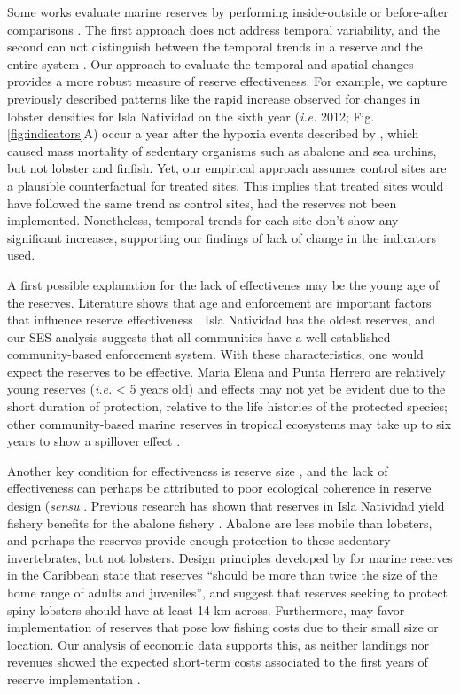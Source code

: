 \documentclass{frontiersSCNS}
\theoremstyle{definition}
\theoremstyle{definition}
\theoremstyle{definition}
\theoremstyle{remark}
\begin{document}
Some works evaluate marine reserves by performing inside-outside
\citep{guidetti_2014-8Z,friedlander_2017-oI,rodriguez_2017-PD} or
before-after comparisons \citep{betti_2017-lq}. The first approach does
not address temporal variability, and the second can not distinguish
between the temporal trends in a reserve and the entire system
\citep{depalma_2018}. Our approach to evaluate the temporal and spatial
changes provides a more robust measure of reserve effectiveness. For
example, we capture previously described patterns like the rapid
increase observed for changes in lobster densities for Isla Natividad on
the sixth year (\emph{i.e.} 2012; Fig. \ref{fig:indicators}A) occur a
year after the hypoxia events described by \citet{micheli_2012-EU},
which caused mass mortality of sedentary organisms such as abalone and
sea urchins, but not lobster and finfish. Yet, our empirical approach
assumes control sites are a plausible counterfactual for treated sites.
This implies that treated sites would have followed the same trend as
control sites, had the reserves not been implemented. Nonetheless,
temporal trends for each site don't show any significant increases,
supporting our findings of lack of change in the indicators used.

A first possible explanation for the lack of effectivenes may be the
young age of the reserves. Literature shows that age and enforcement are
important factors that influence reserve effectiveness
\citep{edgar_2014-UO,babcock_2010}. Isla Natividad has the oldest
reserves, and our SES analysis suggests that all communities have a
well-established community-based enforcement system. With these
characteristics, one would expect the reserves to be effective. Maria
Elena and Punta Herrero are relatively young reserves (\emph{i.e.}
\textless{} 5 years old) and effects may not yet be evident due to the
short duration of protection, relative to the life histories of the
protected species; other community-based marine reserves in tropical
ecosystems may take up to six years to show a spillover effect
\citep{dasilva_2015-zX}.

Another key condition for effectiveness is reserve size
\citep{edgar_2014-UO}, and the lack of effectiveness can perhaps be
attributed to poor ecological coherence in reserve design (\emph{sensu}
\citet{rees_2018}. Previous research has shown that reserves in Isla
Natividad yield fishery benefits for the abalone fishery
\citep{rossetto_2015-V0}. Abalone are less mobile than lobsters, and
perhaps the reserves provide enough protection to these sedentary
invertebrates, but not lobsters. Design principles developed by
\citet{green_2017} for marine reserves in the Caribbean state that
reserves ``should be more than twice the size of the home range of
adults and juveniles'', and suggest that reserves seeking to protect
spiny lobsters should have at least 14 km across. Furthermore, may favor
implementation of reserves that pose low fishing costs due to their
small size or location. Our analysis of economic data supports this, as
neither landings nor revenues showed the expected short-term costs
associated to the first years of reserve implementation
\citep{ovando_2016-Wg}.
\end{document}
